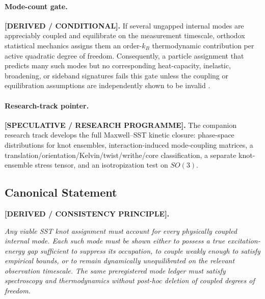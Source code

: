         \paragraph{Mode-count gate.}
        \textbf{[DERIVED / CONDITIONAL].}
        If several ungapped internal modes are appreciably coupled and
        equilibrate on the measurement timescale, orthodox statistical mechanics
        assigns them an order-$k_B$ thermodynamic contribution per active
        quadratic degree of freedom.  Consequently, a particle assignment that
        predicts many such modes but no corresponding heat-capacity, inelastic,
        broadening, or sideband signatures fails this gate unless the coupling or
        equilibration assumptions are independently shown to be invalid
        \cite{PathriaBeale2011}.

        \paragraph{Research-track pointer.}
        \textbf{[SPECULATIVE / RESEARCH PROGRAMME].}
        The companion research track develops the full
        Maxwell--SST kinetic closure: phase-space distributions for knot
        ensembles, interaction-induced mode-coupling matrices, a
        translation/orientation/Kelvin/twist/writhe/core classification,
        a separate knot-ensemble stress tensor, and an isotropization test on
        $SO(3)$.

    \subsection{Canonical Statement}
        \label{subsec:canon_internal_mode_statement}

        \textbf{[DERIVED / CONSISTENCY PRINCIPLE].}
        \begin{center}
            \begin{minipage}{0.92\linewidth}
                \itshape
                Any viable SST knot assignment must account for every physically
                coupled internal mode.  Each such mode must be shown either to
                possess a true excitation-energy gap sufficient to suppress its
                occupation, to couple weakly enough to satisfy empirical bounds, or
                to remain dynamically unequilibrated on the relevant observation
                timescale.  The same preregistered mode ledger must satisfy
                spectroscopy and thermodynamics without post-hoc deletion of
                coupled degrees of freedom.
            \end{minipage}
        \end{center}
